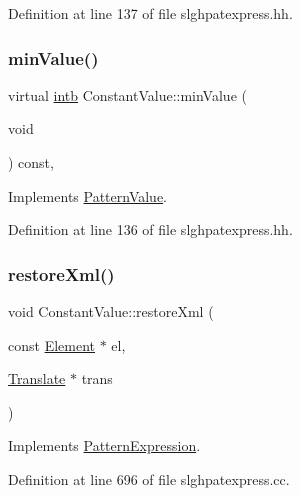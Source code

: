 Definition at line 137 of file slghpatexpress.\+hh.

\mbox{\label{class_constant_value_a559890921d7f3d3b4c1f84b38c5cb751}} 
\subsubsection{\texorpdfstring{minValue()}{minValue()}}
{\footnotesize\ttfamily virtual \mbox{\hyperlink{types_8h_aa925ba3e627c2df89d5b1cfe84fb8572}{intb}} Constant\+Value\+::min\+Value (\begin{DoxyParamCaption}\item[{void}]{ }\end{DoxyParamCaption}) const\hspace{0.3cm}{\ttfamily [inline]}, {\ttfamily [virtual]}}



Implements \mbox{\hyperlink{class_pattern_value_a0dbf85240fe6310e36596fea3bb02f2e}{Pattern\+Value}}.



Definition at line 136 of file slghpatexpress.\+hh.

\mbox{\label{class_constant_value_a93170b89c5eabd65c8f66501d584c60d}} 
\subsubsection{\texorpdfstring{restoreXml()}{restoreXml()}}
{\footnotesize\ttfamily void Constant\+Value\+::restore\+Xml (\begin{DoxyParamCaption}\item[{const \mbox{\hyperlink{class_element}{Element}} $\ast$}]{el,  }\item[{\mbox{\hyperlink{class_translate}{Translate}} $\ast$}]{trans }\end{DoxyParamCaption})\hspace{0.3cm}{\ttfamily [virtual]}}



Implements \mbox{\hyperlink{class_pattern_expression_ad8986afdddbe7a8b64fdcf10478b5715}{Pattern\+Expression}}.



Definition at line 696 of file slghpatexpress.\+cc.

